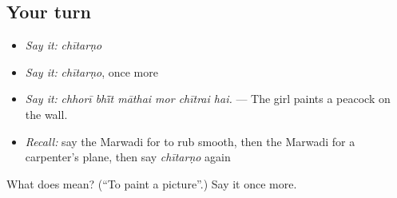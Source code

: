 \subsection*{Your turn}
\begin{itemize}
\raggedright
  \item \emph{Say it:} \emph{chītarṇo}
  \item \emph{Say it:} \emph{chītarṇo}, once more
  \item \emph{Say it:} \emph{chhorī bhī̃t māthai mor chītrai hai.} — The girl paints a peacock on the wall.
  \item \emph{Recall:} say the Marwadi for to rub smooth, then the Marwadi for a carpenter's plane, then say \emph{chītarṇo} again
\end{itemize}

\begin{tcolorbox}[breakable,colback=teal!4,colframe=teal!35!black,title={Before you move on}]
What does  mean? (\textquotedblleft{}To paint a picture\textquotedblright{}.) Say it once more.
\end{tcolorbox}
